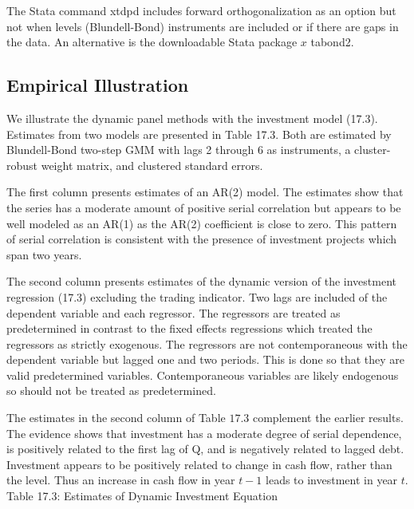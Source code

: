 \documentclass[10pt]{article}
\begin{document}
The Stata command xtdpd includes forward orthogonalization as an option but not when levels (Blundell-Bond) instruments are included or if there are gaps in the data. An alternative is the downloadable Stata package $x$ tabond2.

\subsection{Empirical Illustration}
We illustrate the dynamic panel methods with the investment model (17.3). Estimates from two models are presented in Table 17.3. Both are estimated by Blundell-Bond two-step GMM with lags 2 through 6 as instruments, a cluster-robust weight matrix, and clustered standard errors.

The first column presents estimates of an AR(2) model. The estimates show that the series has a moderate amount of positive serial correlation but appears to be well modeled as an AR(1) as the AR(2) coefficient is close to zero. This pattern of serial correlation is consistent with the presence of investment projects which span two years.

The second column presents estimates of the dynamic version of the investment regression (17.3) excluding the trading indicator. Two lags are included of the dependent variable and each regressor. The regressors are treated as predetermined in contrast to the fixed effects regressions which treated the regressors as strictly exogenous. The regressors are not contemporaneous with the dependent variable but lagged one and two periods. This is done so that they are valid predetermined variables. Contemporaneous variables are likely endogenous so should not be treated as predetermined.

The estimates in the second column of Table $17.3$ complement the earlier results. The evidence shows that investment has a moderate degree of serial dependence, is positively related to the first lag of Q, and is negatively related to lagged debt. Investment appears to be positively related to change in cash flow, rather than the level. Thus an increase in cash flow in year $t-1$ leads to investment in year $t$. Table 17.3: Estimates of Dynamic Investment Equation
\end{document}
